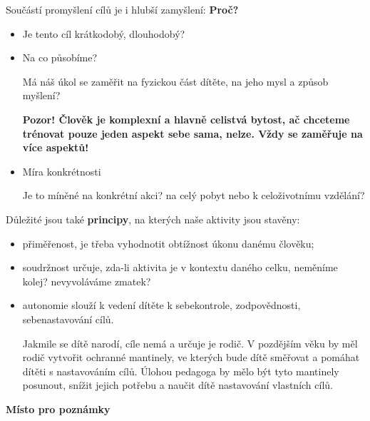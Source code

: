 \documentclass[a4paper,12pt,final]{report}
\begin{document}
Součástí promyšlení cílů je i hlubší zamyšlení: \textbf{Proč?} 

\begin{itemize}
 \item Je tento cíl krátkodobý, dlouhodobý?
 \item Na co působíme?
 
Má náš úkol se zaměřit na fyzickou část dítěte, na jeho mysl a způsob myšlení?

\textbf{Pozor! Člověk je komplexní a hlavně celistvá bytost, ač chceteme trénovat pouze jeden aspekt sebe sama, nelze. Vždy se zaměřuje na více aspektů!}

 \item Míra konkrétnosti
 
 Je to míněné na konkrétní akci? na celý pobyt nebo k celoživotnímu vzdělání?
\end{itemize}

Důležité jsou také \textbf{principy}, na kterých naše aktivity jsou stavěny:
\begin{itemize}
 \item přiměřenost, je třeba vyhodnotit obtížnost úkonu danému člověku;
 \item soudržnost určuje, zda-li aktivita je v kontextu daného celku, neměníme kolej? nevyvoláváme zmatek?
 \item autonomie slouží k vedení dítěte k sebekontrole, zodpovědnosti, sebenastavování cílů.
 
 Jakmile se dítě narodí, cíle nemá a určuje je rodič. V pozdějším věku by měl rodič vytvořit ochranné mantinely, ve kterých bude dítě směřovat a pomáhat dítěti s nastavováním cílů. Úlohou pedagoga by mělo být tyto mantinely posunout, snížit jejich potřebu a naučit dítě nastavování vlastních cílů.
\end{itemize}

\pagelogos
\begin{samepage}\begin{flushleft}
\end{flushleft}
\textbf{Místo pro poznámky}
\begin{center}
\end{center}
\vspace{2cm}\pagelogos
\end{samepage}
\end{document}
